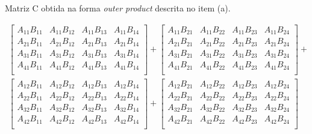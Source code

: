 \documentclass[a4paper,12pt, leqno, answers]{exam}
\begin{document}
\begin{questions}
\begin{parts}
        Matriz C obtida na forma \textit{outer product} descrita no item (a).
        \begin{solution}
            \[
            \begin{split}
                \begin{bmatrix}
                    A_{11} B_{11} & A_{11} B_{12} & A_{11} B_{13} & A_{11} B_{14} \\
                    A_{21} B_{11} & A_{21} B_{12} & A_{21} B_{13} & A_{21} B_{14} \\
                    A_{31} B_{11} & A_{31} B_{12} & A_{31} B_{13} & A_{31} B_{14} \\
                    A_{41} B_{11} & A_{41} B_{12} & A_{41} B_{13} & A_{41} B_{14} \\
                \end{bmatrix} + \begin{bmatrix}
                    A_{11} B_{21} & A_{11} B_{22} & A_{11} B_{23} & A_{11} B_{24} \\
                    A_{21} B_{21} & A_{21} B_{22} & A_{21} B_{23} & A_{21} B_{24} \\
                    A_{31} B_{21} & A_{31} B_{22} & A_{31} B_{23} & A_{31} B_{24} \\
                    A_{41} B_{21} & A_{41} B_{22} & A_{41} B_{23} & A_{41} B_{24} \\
                \end{bmatrix} + \\ \begin{bmatrix}
                    A_{12} B_{11} & A_{12} B_{12} & A_{12} B_{13} & A_{12} B_{14} \\
                    A_{22} B_{11} & A_{22} B_{12} & A_{22} B_{13} & A_{22} B_{14} \\
                    A_{32} B_{11} & A_{32} B_{12} & A_{32} B_{13} & A_{32} B_{14} \\
                    A_{42} B_{11} & A_{42} B_{12} & A_{42} B_{13} & A_{42} B_{14} \\
                \end{bmatrix} + \begin{bmatrix}
                    A_{12} B_{21} & A_{12} B_{22} & A_{12} B_{23} & A_{12} B_{24} \\
                    A_{22} B_{21} & A_{22} B_{22} & A_{22} B_{23} & A_{22} B_{24} \\
                    A_{32} B_{21} & A_{32} B_{22} & A_{32} B_{23} & A_{32} B_{24} \\
                    A_{42} B_{21} & A_{42} B_{22} & A_{42} B_{23} & A_{42} B_{24} \\
                \end{bmatrix} 
            \end{split}
            \]
        \end{solution}
    \end{parts}


\end{questions}
\end{document}
